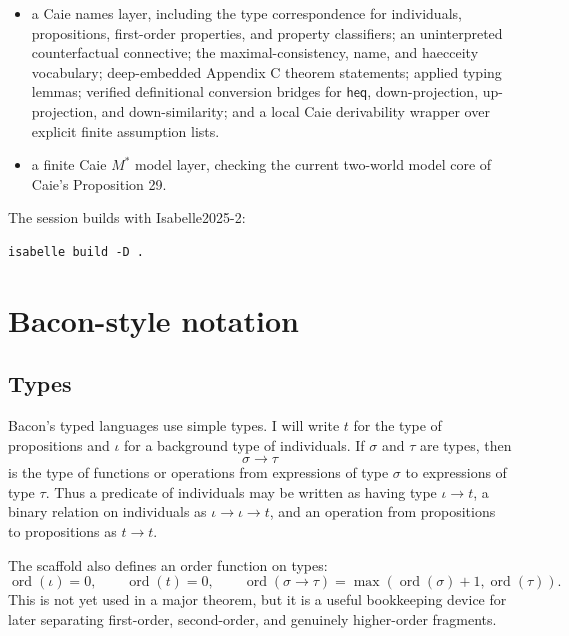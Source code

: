 \documentclass[12pt,leqno]{article}
\newcommand{\heq}{\mathsf{heq}}
\begin{document}
\begin{itemize}[leftmargin=2em]
  canonical truth lemmas, substitutional term-model semantics, H/C
  Henkin-validity and term-model completeness biconditionals, explicit H/C
  countermodel packages, and strengthened CE/CEV local consequence machinery
  for the remaining completeness work;
\item a Caie names layer, including the type correspondence for individuals,
  propositions, first-order properties, and property classifiers; an
  uninterpreted counterfactual connective; the maximal-consistency, name, and
  haecceity vocabulary; deep-embedded Appendix C theorem statements; applied
  typing lemmas; verified definitional conversion bridges for \(\heq\),
  down-projection, up-projection, and down-similarity; and a local Caie
  derivability wrapper over explicit finite assumption lists.
\item a finite Caie \(M^*\) model layer, checking the current two-world
  model core of Caie's Proposition 29.
\end{itemize}

The session builds with Isabelle2025-2:
\begin{verbatim}
isabelle build -D .
\end{verbatim}

\section{Bacon-style notation}

\subsection{Types}

Bacon's typed languages use simple types.  I will write $t$ for the type of
propositions and $\iota$ for a background type of individuals.  If $\sigma$ and
$\tau$ are types, then
\[
  \sigma \to \tau
\]
is the type of functions or operations from expressions of type $\sigma$ to
expressions of type $\tau$.  Thus a predicate of individuals may be written as
having type $\iota \to t$, a binary relation on individuals as
$\iota \to \iota \to t$, and an operation from propositions to propositions as
$t \to t$.

The scaffold also defines an order function on types:
\[
  \operatorname{ord}(\iota)=0,\qquad
  \operatorname{ord}(t)=0,\qquad
  \operatorname{ord}(\sigma\to\tau)
    = \max(\operatorname{ord}(\sigma)+1,\operatorname{ord}(\tau)).
\]
This is not yet used in a major theorem, but it is a useful bookkeeping device
for later separating first-order, second-order, and genuinely higher-order
fragments.
\end{document}
